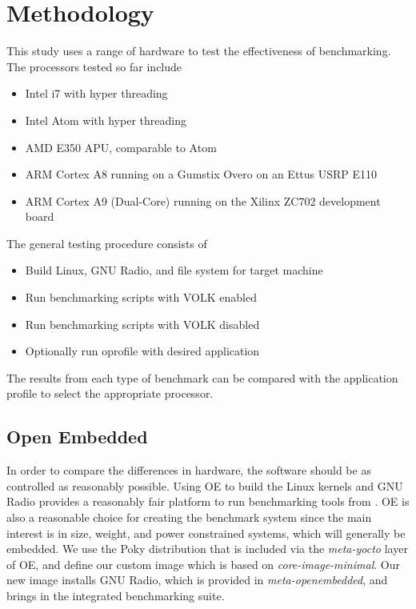 \documentclass[english]{article}
\begin{document}
\section{Methodology}
This study uses a range of hardware to test the effectiveness of benchmarking. 
The processors tested so far include 
\begin{itemize}
\item Intel i7 with hyper threading 
\item Intel Atom with hyper threading 
\item AMD E350 APU, comparable to Atom 
\item ARM Cortex A8 running on a Gumstix Overo on an Ettus USRP E110 
\item ARM Cortex A9 (Dual-Core) running on the Xilinx ZC702 development board
\end{itemize}

The general testing procedure consists of 
\begin{itemize}
\item Build Linux, GNU Radio, and file system for target machine 
\item Run benchmarking scripts with VOLK enabled 
\item Run benchmarking scripts with VOLK disabled 
\item Optionally run oprofile with desired application 
\end{itemize}

The results from each type of benchmark can be compared with the application profile to select the appropriate processor. 

\subsection{Open Embedded}
In order to compare the differences in hardware, the software should be as controlled as reasonably possible. 
Using OE to build the Linux kernels and GNU Radio provides a reasonably fair platform to run benchmarking tools from \cite{yocto-ref}. 
OE is also a reasonable choice for creating the benchmark system since the main interest is in size, weight, and power constrained systems, which will generally be embedded. 
We use the Poky distribution that is included via the \textit{meta-yocto} layer of OE, and define our custom image which is based on \textit{core-image-minimal}.
Our new image installs GNU Radio, which is provided in \textit{meta-openembedded}, and brings in the integrated benchmarking suite.
\end{document}
